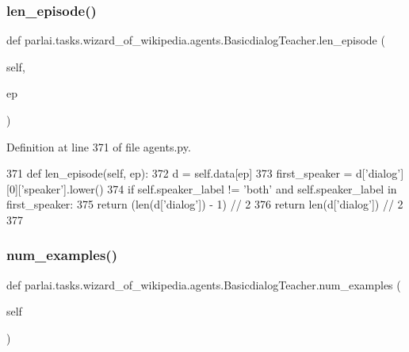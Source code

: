 \subsubsection{\texorpdfstring{len\+\_\+episode()}{len\_episode()}}
{\footnotesize\ttfamily def parlai.\+tasks.\+wizard\+\_\+of\+\_\+wikipedia.\+agents.\+Basicdialog\+Teacher.\+len\+\_\+episode (\begin{DoxyParamCaption}\item[{}]{self,  }\item[{}]{ep }\end{DoxyParamCaption})}



Definition at line 371 of file agents.\+py.


\begin{DoxyCode}
371     \textcolor{keyword}{def }len\_episode(self, ep):
372         d = self.data[ep]
373         first\_speaker = d[\textcolor{stringliteral}{'dialog'}][0][\textcolor{stringliteral}{'speaker'}].lower()
374         \textcolor{keywordflow}{if} self.speaker\_label != \textcolor{stringliteral}{'both'} \textcolor{keywordflow}{and} self.speaker\_label \textcolor{keywordflow}{in} first\_speaker:
375             \textcolor{keywordflow}{return} (len(d[\textcolor{stringliteral}{'dialog'}]) - 1) // 2
376         \textcolor{keywordflow}{return} len(d[\textcolor{stringliteral}{'dialog'}]) // 2
377 
\end{DoxyCode}
\mbox{\label{classparlai_1_1tasks_1_1wizard__of__wikipedia_1_1agents_1_1BasicdialogTeacher_ac740a641709550f191b2c48adfb14a13}} 
\subsubsection{\texorpdfstring{num\+\_\+examples()}{num\_examples()}}
{\footnotesize\ttfamily def parlai.\+tasks.\+wizard\+\_\+of\+\_\+wikipedia.\+agents.\+Basicdialog\+Teacher.\+num\+\_\+examples (\begin{DoxyParamCaption}\item[{}]{self }\end{DoxyParamCaption})}



